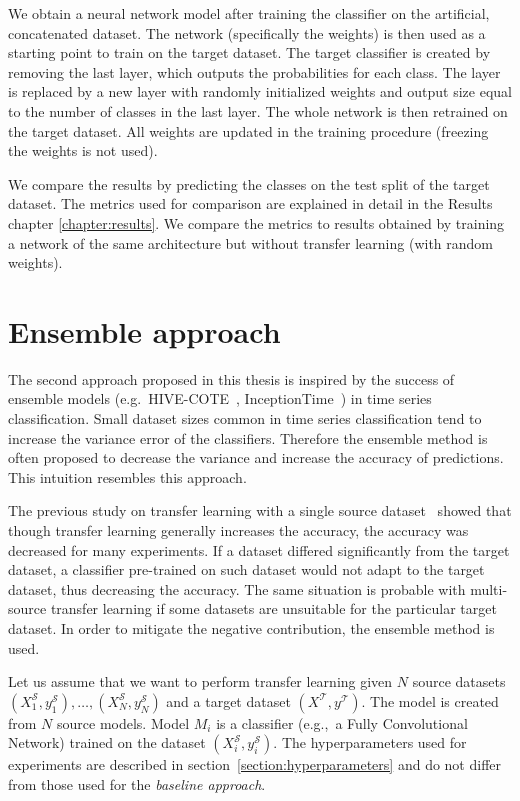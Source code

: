 \documentclass[a4paper,11pt,twoside]{report}
\theoremstyle{definition}
\begin{document}
We obtain a neural network model after training the classifier on the artificial, concatenated dataset. The network (specifically the weights) is then used as a starting point to train on the target dataset. The target classifier is created by removing the last layer, which outputs the probabilities for each class. The layer is replaced by a new layer with randomly initialized weights and output size equal to the number of classes in the last layer. The whole network is then retrained on the target dataset. All weights are updated in the training procedure (freezing the weights is not used).

We compare the results by predicting the classes on the test split of the target dataset. The metrics used for comparison are explained in detail in the Results chapter \ref{chapter:results}. We compare the metrics to results obtained by training a network of the same architecture but without transfer learning (with random weights).

\section{Ensemble approach}\label{section:ensemble}
The second approach proposed in this thesis is inspired by the success of ensemble models (e.g.~HIVE-COTE~\cite{hivecote}, InceptionTime~\cite{inceptiontime}) in time series classification. Small dataset sizes common in time series classification tend to increase the variance error of the classifiers. Therefore the ensemble method is often proposed to decrease the variance and increase the accuracy of predictions. This intuition resembles this approach.

The previous study on transfer learning with a single source dataset~\cite{transfer_learning_time_series} showed that though transfer learning generally increases the accuracy, the accuracy was decreased for many experiments. If a dataset differed significantly from the target dataset, a classifier pre-trained on such dataset would not adapt to the target dataset, thus decreasing the accuracy. The same situation is probable with multi-source transfer learning if some datasets are unsuitable for the particular target dataset. In order to mitigate the negative contribution, the ensemble method is used.

Let us assume that we want to perform transfer learning given $N$ source datasets $(X^\mathcal{S}_1, y^\mathcal{S}_1), \dots, (X^\mathcal{S}_N, y^\mathcal{S}_N)$ and a target dataset $(X^\mathcal{T}, y^\mathcal{T})$.
The model is created from $N$ source models. Model $M_i$ is a classifier (e.g.,~a Fully Convolutional Network) trained on the dataset $(X^\mathcal{S}_i, y^\mathcal{S}_i)$. The hyperparameters used for experiments are described in section~\ref{section:hyperparameters} and do not differ from those used for the \textit{baseline approach}.
\end{document}
